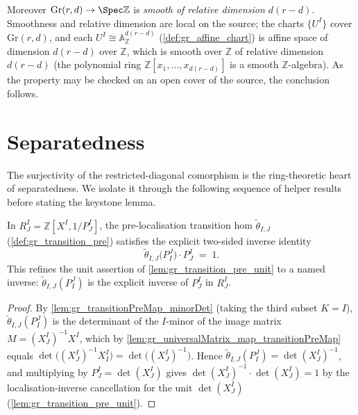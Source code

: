 \begin{definition}
  Moreover \(\mathrm{Gr}(r,d) \to \Spec \mathbb{Z}\) is \emph{smooth of relative
  dimension \(d(r-d)\)}. Smoothness and relative dimension are local on the
  source; the charts \(\{U^I\}\) cover \(\mathrm{Gr}(r,d)\), and each
  \(U^I \cong \mathbb{A}^{d(r-d)}_{\mathbb{Z}}\) (\cref{def:gr_affine_chart}) is
  affine space of dimension \(d(r-d)\) over \(\mathbb{Z}\), which is smooth over
  \(\mathbb{Z}\) of relative dimension \(d(r-d)\) (the polynomial ring
  \(\mathbb{Z}[x_1, \dots, x_{d(r-d)}]\) is a smooth \(\mathbb{Z}\)-algebra). As
  the property may be checked on an open cover of the source, the conclusion
  follows.
\end{definition}

\section{Separatedness}
\label{sec:gr_separated}

The surjectivity of the restricted-diagonal comorphism is the ring-theoretic
heart of separatedness. We isolate it through the following sequence of
helper results before stating the keystone lemma.

\begin{lemma}[Two-sided inverse identity \(\tilde\theta_{I,J}(P^J_I)\,P^I_J = 1\)]\leanok
  \label{lem:gr_transitionPreMap_minorDet_swap_mul}
  In \(R^I_J = \mathbb{Z}[X^I, 1/P^I_J]\), the pre-localisation transition hom
  \(\tilde\theta_{I,J}\) (\cref{def:gr_transition_pre}) satisfies the explicit
  two-sided inverse identity
  \[
    \tilde\theta_{I,J}\bigl(P^J_I\bigr) \cdot P^I_J \;=\; 1 .
  \]
  This refines the unit assertion of \cref{lem:gr_transition_pre_unit} to a named
  inverse: \(\tilde\theta_{I,J}(P^J_I)\) is the explicit inverse of \(P^I_J\) in
  \(R^I_J\).
\end{lemma}
\begin{proof}
  \leanok
  By \cref{lem:gr_transitionPreMap_minorDet} (taking the third subset \(K = I\)),
  \(\tilde\theta_{I,J}(P^J_I)\) is the determinant of the \(I\)-minor of the image
  matrix \(M = (X^I_J)^{-1} X^I\), which by
  \cref{lem:gr_universalMatrix_map_transitionPreMap} equals
  \(\det\bigl((X^I_J)^{-1} X^I_I\bigr) = \det\bigl((X^I_J)^{-1}\bigr)\). Hence
  \(\tilde\theta_{I,J}(P^J_I) = \det(X^I_J)^{-1}\), and multiplying by \(P^I_J =
  \det(X^I_J)\) gives \(\det(X^I_J)^{-1} \cdot \det(X^I_J) = 1\) by the
  localisation-inverse cancellation for the unit \(\det(X^I_J)\)
  (\cref{lem:gr_transition_pre_unit}).
\end{proof}

